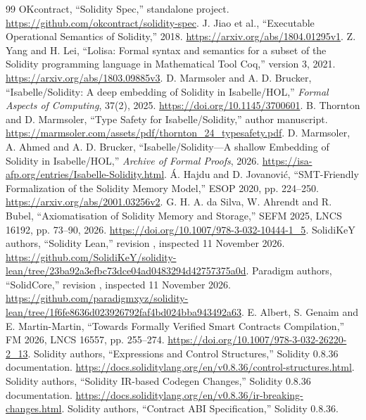\documentclass[conference]{IEEEtran}
\begin{document}
\begin{thebibliography}{99}
 OKcontract, ``Solidity Spec,'' standalone project.
\url{https://github.com/okcontract/solidity-spec}.
 J. Jiao et al., ``Executable Operational Semantics of
Solidity,'' 2018. \url{https://arxiv.org/abs/1804.01295v1}.
 Z. Yang and H. Lei, ``Lolisa: Formal syntax and semantics for a
subset of the Solidity programming language in Mathematical Tool Coq,''
version 3, 2021. \url{https://arxiv.org/abs/1803.09885v3}.
 D. Marmsoler and A. D. Brucker, ``Isabelle/Solidity: A deep
embedding of Solidity in Isabelle/HOL,'' \emph{Formal Aspects of Computing},
37(2), 2025. \url{https://doi.org/10.1145/3700601}.
 B. Thornton and D. Marmsoler,
``Type Safety for Isabelle/Solidity,'' author manuscript.
\url{https://marmsoler.com/assets/pdf/thornton_24_typesafety.pdf}.
 D. Marmsoler, A. Ahmed and A. D. Brucker,
``Isabelle/Solidity---A shallow Embedding of Solidity in Isabelle/HOL,''
\emph{Archive of Formal Proofs}, 2026.
\url{https://isa-afp.org/entries/Isabelle-Solidity.html}.
 \'A. Hajdu and D. Jovanovi\'c, ``SMT-Friendly Formalization
of the Solidity Memory Model,'' ESOP 2020, pp. 224--250.
\url{https://arxiv.org/abs/2001.03256v2}.
 G. H. A. da Silva, W. Ahrendt and R. Bubel,
``Axiomatisation of Solidity Memory and Storage,'' SEFM 2025, LNCS 16192,
pp. 73--90, 2026. \url{https://doi.org/10.1007/978-3-032-10444-1_5}.
 SolidiKeY authors, ``Solidity Lean,'' revision
, inspected 11 November 2026.
\url{https://github.com/SolidiKeY/solidity-lean/tree/23ba92a3efbc73dce04ad0483294d42757375a0d}.
 Paradigm authors, ``SolidCore,'' revision
, inspected 11 November 2026.
\url{https://github.com/paradigmxyz/solidity-lean/tree/1f6fe8636d023926792faf4bd024bba943492a63}.
 E. Albert, S. Genaim and E. Martin-Martin,
``Towards Formally Verified Smart Contracts Compilation,''
FM 2026, LNCS 16557, pp. 255--274.
\url{https://doi.org/10.1007/978-3-032-26220-2_13}.
 Solidity authors, ``Expressions and Control Structures,''
Solidity 0.8.36 documentation.
\url{https://docs.soliditylang.org/en/v0.8.36/control-structures.html}.
 Solidity authors, ``Solidity IR-based Codegen Changes,''
Solidity 0.8.36 documentation.
\url{https://docs.soliditylang.org/en/v0.8.36/ir-breaking-changes.html}.
 Solidity authors, ``Contract ABI Specification,'' Solidity 0.8.36.

\end{thebibliography}
\end{document}
